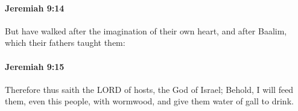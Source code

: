 		\paragraph{Jeremiah 9:14} %
			\label{JEREMIAH-9-14}

			But have walked after the imagination of their own heart, and after Baalim, which their fathers taught them:


		\paragraph{Jeremiah 9:15} %
			\label{JEREMIAH-9-15}

			Therefore thus saith the LORD of hosts, the God of Israel; Behold, I will feed them, even this people, with wormwood, and give them water of gall to drink.


